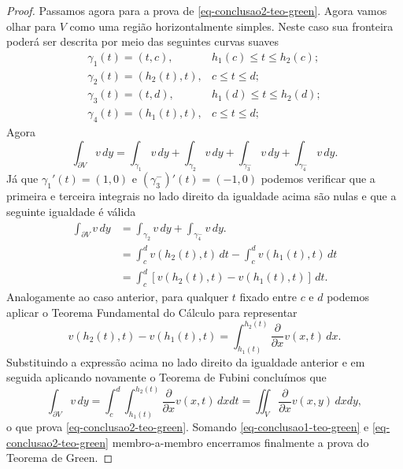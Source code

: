 \begin{proof}
Passamos agora para a prova de \eqref{eq-conclusao2-teo-green}. Agora vamos olhar para $V$ como 
uma região horizontalmente simples. Neste caso sua fronteira poderá ser descrita por meio das seguintes
curvas suaves
\[
\begin{array}{lc}
	\gamma_1(t) = (t,c),& h_1(c)\leqslant t\leqslant h_2(c);
	\\[0.2cm]
	\gamma_2(t) = (h_2(t),t),& c\leqslant t\leqslant d;
	\\[0.2cm]
	\gamma_{3}(t) = (t,d),&  h_1(d)\leqslant t\leqslant h_2(d);
	\\[0.2cm]
	\gamma_{4}(t) = (h_1(t),t),& c\leqslant t\leqslant d;
\end{array} 
\]
Agora
\[
\int_{\partial V} v\, dy
=
\int_{\gamma_1} v\, dy
+
\int_{\gamma_2} v\, dy
+
\int_{\gamma^{-}_3} v\, dy
+
\int_{\gamma^{-}_4} v\, dy.
\]
Já que $\gamma_1'(t)=(1,0)$ e $(\gamma^{-}_3)'(t)=(-1,0)$ podemos verificar que a primeira e terceira integrais no 
lado direito da igualdade acima são nulas e que a seguinte igualdade é válida
\begin{align*}
\int_{\partial V} v\, dy
&=
\int_{\gamma_2} v\, dy
+
\int_{\gamma^{-}_4} v\, dy.	
\\
&=
\int_{c}^{d} v(h_2(t),t)\, dt -\int_{c}^{d} v(h_1(t),t)\, dt
\\
&=
\int_{c}^{d} [v(h_2(t),t) -  v(h_1(t),t)]\, dt.
\end{align*}
Analogamente ao caso anterior, para qualquer $t$ fixado entre $c$ e $d$ podemos aplicar o Teorema Fundamental 
do Cálculo para representar 
\[
v(h_2(t),t) -  v(h_1(t),t) = \int_{h_1(t)}^{h_2(t)} \frac{\partial}{\partial x}v(x,t)\, dx.
\]
Substituindo a expressão acima no lado direito da igualdade anterior e em seguida
aplicando novamente o Teorema de Fubini concluímos que 
\[
\int_{\partial V} v\, dy
=
\int_{c}^{d}  \int_{h_1(t)}^{h_2(t)} \frac{\partial}{\partial x}v(x,t)\, dx dt
=
\iint_{V} \frac{\partial}{\partial x}v(x,y)\, dx dy,
\]
o que prova \eqref{eq-conclusao2-teo-green}. Somando \eqref{eq-conclusao1-teo-green} e 
\eqref{eq-conclusao2-teo-green} membro-a-membro encerramos finalmente 
a prova do Teorema de Green.
\end{proof}



